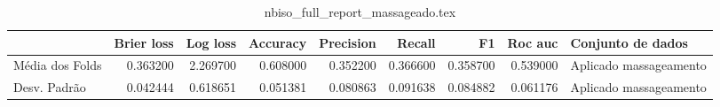 \begin{table}
\centering
\caption{nbiso_full_report_massageado.tex}
\label{nbiso_full_report_massageado.tex}
\begin{tabular}{lrrrrrrrl}
\toprule
{} &  Brier  loss               &  Log loss &  Accuracy  &  Precision  &   Recall  &       F1  &  Roc auc  &       Conjunto de dados \\
\midrule
Média dos Folds &     0.363200 &  2.269700 &   0.608000 &    0.352200 &  0.366600 &  0.358700 &  0.539000 &  Aplicado massageamento \\
Desv. Padrão    &     0.042444 &  0.618651 &   0.051381 &    0.080863 &  0.091638 &  0.084882 &  0.061176 &  Aplicado massageamento \\
\bottomrule
\end{tabular}
\end{table}
